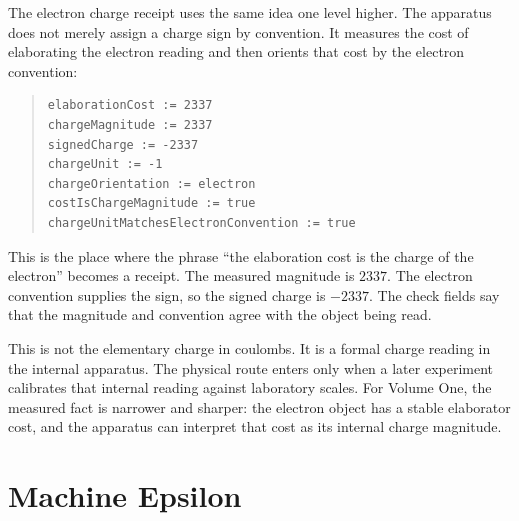 The electron charge receipt uses the same idea one level higher. The apparatus does not merely assign a charge
sign by convention. It measures the cost of elaborating the electron reading and then orients that cost by the
electron convention:
\begin{quote}\small
\begin{verbatim}
elaborationCost := 2337
chargeMagnitude := 2337
signedCharge := -2337
chargeUnit := -1
chargeOrientation := electron
costIsChargeMagnitude := true
chargeUnitMatchesElectronConvention := true
\end{verbatim}
\end{quote}
This is the place where the phrase ``the elaboration cost is the charge of the electron'' becomes a receipt.
The measured magnitude is \(2337\). The electron convention supplies the sign, so the signed charge is
\(-2337\). The check fields say that the magnitude and convention agree with the object being read.

This is not the elementary charge in coulombs. It is a formal charge reading in the internal apparatus. The
physical route enters only when a later experiment calibrates that internal reading against laboratory scales.
For Volume One, the measured fact is narrower and sharper: the electron object has a stable elaborator cost, and
the apparatus can interpret that cost as its internal charge magnitude.

\section{Machine Epsilon}

